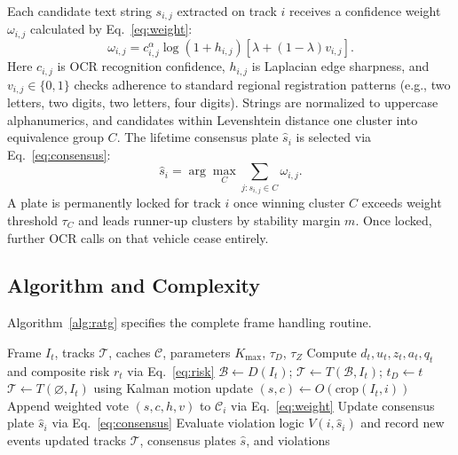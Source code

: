 Each candidate text string $s_{i,j}$ extracted on track $i$ receives a confidence weight $\omega_{i,j}$ calculated by Eq.~\eqref{eq:weight}:
\begin{equation}
 \omega_{i,j}=c_{i,j}^{\alpha}\log(1+h_{i,j})[\lambda+(1-\lambda)v_{i,j}].
 \label{eq:weight}
\end{equation}
Here $c_{i,j}$ is OCR recognition confidence, $h_{i,j}$ is Laplacian edge sharpness, and $v_{i,j}\in\{0,1\}$ checks adherence to standard regional registration patterns (e.g., two letters, two digits, two letters, four digits). Strings are normalized to uppercase alphanumerics, and candidates within Levenshtein distance one cluster into equivalence group $C$. The lifetime consensus plate $\hat{s}_i$ is selected via Eq.~\eqref{eq:consensus}:
\begin{equation}
 \hat{s}_i=\arg\max_C\sum_{j:s_{i,j}\in C}\omega_{i,j}.
 \label{eq:consensus}
\end{equation}
A plate is permanently locked for track $i$ once winning cluster $C$ exceeds weight threshold $\tau_C$ and leads runner-up clusters by stability margin $m$. Once locked, further OCR calls on that vehicle cease entirely.

\subsection{Algorithm and Complexity}
Algorithm~\ref{alg:ratg} specifies the complete frame handling routine.
\begin{algorithm}[t]
\caption{RATG-OC Frame Processing Pipeline}
\label{alg:ratg}
\begin{algorithmic}[1]
\REQUIRE Frame $I_t$, tracks $\mathcal{T}$, caches $\mathcal{C}$, parameters $K_{\max}$, $\tau_D$, $\tau_Z$
\STATE Compute $d_t,u_t,z_t,a_t,q_t$ and composite risk $r_t$ via Eq.~\eqref{eq:risk}
  \STATE $\mathcal{B}\leftarrow D(I_t)$; $\mathcal{T}\leftarrow T(\mathcal{B},I_t)$; $t_D \leftarrow t$
\ELSE
  \STATE $\mathcal{T}\leftarrow T(\varnothing,I_t)$ using Kalman motion update
\ENDIF
{}
    \STATE $(s,c)\leftarrow O(\mathrm{crop}(I_t,i))$
    \STATE Append weighted vote $(s,c,h,v)$ to $\mathcal{C}_i$ via Eq.~\eqref{eq:weight}
    \STATE Update consensus plate $\hat{s}_i$ via Eq.~\eqref{eq:consensus}
  \ENDIF
  \STATE Evaluate violation logic $V(i,\hat{s}_i)$ and record new events
\ENDFOR
\RETURN updated tracks $\mathcal{T}$, consensus plates $\hat{s}$, and violations
\end{algorithmic}
\end{algorithm}

